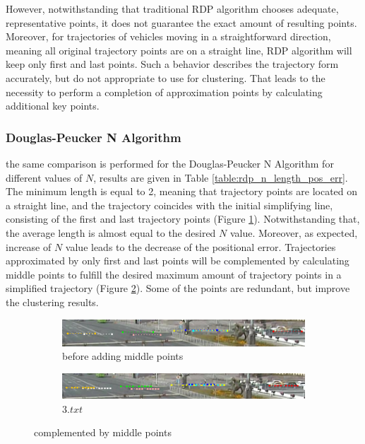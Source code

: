 However, notwithstanding that traditional RDP algorithm chooses adequate, representative points, it does not guarantee the exact amount of resulting points. Moreover, for trajectories of vehicles moving in a straightforward direction, meaning all original trajectory points are on a straight line, RDP algorithm will keep only first and last points. Such a behavior describes the trajectory form accurately, but do not appropriate to use for clustering. That leads to the necessity to perform a completion of approximation points by calculating additional key points.

\subsubsection{Douglas-Peucker N Algorithm}

the same comparison is performed for the Douglas-Peucker N Algorithm for different values of $N$, results are given in Table \ref{table:rdp_n_length_pos_err}. The minimum length is equal to 2, meaning that trajectory points are located on a straight line, and the trajectory coincides with the initial simplifying line, consisting of the first and last trajectory points (Figure \ref{fig:rdp_2_points_only}). Notwithstanding that, the average length is almost equal to the desired $N$ value. Moreover, as expected, increase of $N$ value leads to the decrease of the positional error. Trajectories approximated by only first and last points will be complemented by calculating middle points to fulfill the desired maximum amount of trajectory points in a simplified trajectory (Figure \ref{fig:rdp_2_points_filled}). Some of the points are redundant, but improve the clustering results.

\begin{figure}[!htb]
	\centering
	\begin{subfigure}[!htb]{0.9\textwidth}
		\centering{}
		\includegraphics[width=\textwidth]{images/rdp-2-points.png}
		\caption{before adding middle points}
		\label{fig:rdp_2_points_only}
	\end{subfigure}
	\hfill
	\begin{subfigure}[!htb]{0.9\textwidth}
		\centering{}
		\includegraphics[width=\textwidth]{images/rdp-2-points-filled.png}
		\caption{$3.txt$}
		\label{fig:rdp_2_points_filled}
	\end{subfigure}
	\caption{complemented by middle points}
	\label{fig:rdp_2_points}
\end{figure}

